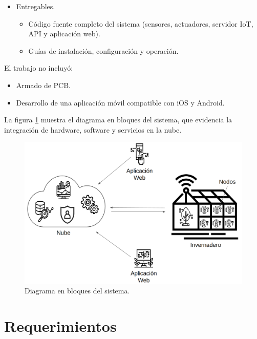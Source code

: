 \begin{itemize}
      \item Entregables.
            \begin{itemize}
                  \item Código fuente completo del sistema (sensores, actuadores, servidor IoT, API y
                        aplicación web).
                  \item Guías de instalación, configuración y operación.
            \end{itemize}
\end{itemize}

El trabajo no incluyó:
\begin{itemize}
      \item Armado de PCB.
      \item Desarrollo de una aplicación móvil compatible con iOS y Android.
\end{itemize}

\hspace{1cm}

La figura \ref{fig:diagBloques} muestra el diagrama en bloques del sistema, que
evidencia la integración de hardware, software y servicios en la nube.

\begin{figure}[htpb]
      \centering
      \includegraphics[width=\textwidth]{./Images/1.png}
      \caption{Diagrama en bloques del sistema.}
      \label{fig:diagBloques}
\end{figure}


\section{Requerimientos}

